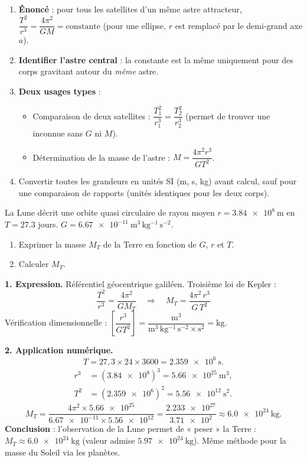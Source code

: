 \documentclass[11pt]{article}
\begin{document}
\begin{methode}
\begin{enumerate}
\item \textbf{Énoncé} : pour tous les satellites d'un même astre attracteur, $\dfrac{T^2}{r^3} = \dfrac{4\pi^2}{GM} = \text{constante}$ (pour une ellipse, $r$ est remplacé par le demi-grand axe $a$).
\item \textbf{Identifier l'astre central} : la constante est la même uniquement pour des corps gravitant autour du \emph{même} astre.
\item \textbf{Deux usages types} :
  \begin{itemize}
  \item Comparaison de deux satellites : $\dfrac{T_1^2}{r_1^3} = \dfrac{T_2^2}{r_2^3}$ (permet de trouver une inconnue sans $G$ ni $M$).
  \item Détermination de la masse de l'astre : $M = \dfrac{4\pi^2 r^3}{G T^2}$.
  \end{itemize}
\item Convertir toutes les grandeurs en unités SI (m, s, kg) avant calcul, sauf pour une comparaison de rapports (unités identiques pour les deux corps).
\end{enumerate}
\end{methode}

\begin{exoresolu}
La Lune décrit une orbite quasi circulaire de rayon moyen $r = \num{3,84e8}\ \mathrm{m}$ en $T = \num{27,3}$ jours. $G = \num{6,67e-11}\ \mathrm{m^3\,kg^{-1}\,s^{-2}}$.
\begin{enumerate}
\item Exprimer la masse $M_T$ de la Terre en fonction de $G$, $r$ et $T$.
\item Calculer $M_T$.
\end{enumerate}
\tcblower
\textbf{1. Expression.} Référentiel géocentrique galiléen. Troisième loi de Kepler :
\[ \frac{T^2}{r^3} = \frac{4\pi^2}{G M_T} \quad \Longrightarrow \quad \boxed{M_T = \frac{4\pi^2\, r^3}{G\, T^2}} \]
Vérification dimensionnelle : $\left[\dfrac{r^3}{GT^2}\right] = \dfrac{\mathrm{m^3}}{\mathrm{m^3\,kg^{-1}\,s^{-2}} \times \mathrm{s^2}} = \mathrm{kg}$.

\textbf{2. Application numérique.}
\[ T = 27,3 \times 24 \times 3600 = \num{2,359e6}\ \mathrm{s}. \]
\begin{align*}
r^3 &= (\num{3,84e8})^3 = \num{5,66e25}\ \mathrm{m^3}, \\
T^2 &= (\num{2,359e6})^2 = \num{5,56e12}\ \mathrm{s^2}.
\end{align*}
\[ M_T = \frac{4\pi^2 \times \num{5,66e25}}{\num{6,67e-11} \times \num{5,56e12}} = \frac{\num{2,233e27}}{\num{3,71e2}} \approx \num{6,0e24}\ \mathrm{kg}. \]
\textbf{Conclusion} : l'observation de la Lune permet de « peser » la Terre : $M_T \approx \num{6,0e24}\ \mathrm{kg}$ (valeur admise $\num{5,97e24}\ \mathrm{kg}$). Même méthode pour la masse du Soleil via les planètes.
\end{exoresolu}
\end{document}
